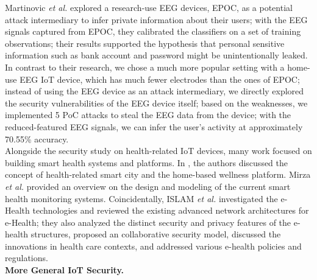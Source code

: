 %
\indent Martinovic \emph{et al.} \cite{martinovic2012feasibility} explored a research-use EEG devices, EPOC, as a potential attack intermediary to infer private information about their users; with the EEG signals captured from EPOC, they calibrated the classifiers on a set of training observations; their results supported the hypothesis that personal sensitive information such as bank account and password might be unintentionally leaked. In contrast to their research, we chose a much more popular setting with a home-use EEG IoT device, which has much fewer electrodes than the ones of EPOC; instead of using the EEG device as an attack intermediary, we directly explored the security vulnerabilities of the EEG device itself; based on the weaknesses, we implemented 5 PoC attacks to steal the EEG data from the device; with the reduced-featured EEG signals, we can infer the user's activity at approximately 70.55\% accuracy.\\
\indent
Alongside the security study on health-related IoT devices, many work focused on building smart health systems and platforms. In \cite{solanas2014smart} \cite{yang2014health}, the authors discussed the concept of health-related smart city and the home-based wellness platform. Mirza \emph{et al.} \cite{baig2013smart} provided an overview on the design and modeling of the current smart health monitoring systems. Coincidentally, ISLAM \emph{et al.} \cite{islam2015internet} investigated the e-Health technologies and reviewed the existing advanced network architectures for e-Health; they also analyzed the distinct security and privacy features of the e-health structures, proposed an collaborative security model, discussed the innovations in health care contexts, and addressed various e-health policies and regulations.\\
%
\indent\textbf{More General IoT Security.}
